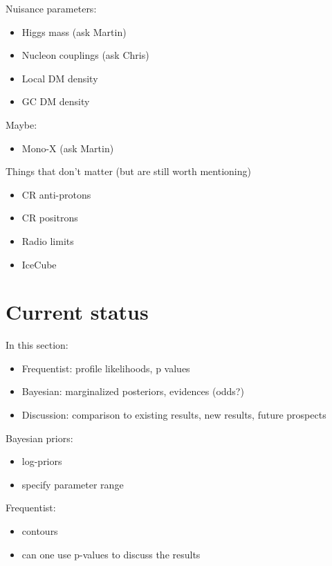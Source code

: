Nuisance parameters:
\begin{itemize}
  \item Higgs mass (ask Martin)
  \item Nucleon couplings (ask Chris)
  \item Local DM density
  \item GC DM density
\end{itemize}

Maybe:
\begin{itemize}
  \item Mono-X (ask Martin)
\end{itemize}

Things that don't matter (but are still worth mentioning)
\begin{itemize}
  \item CR anti-protons
  \item CR positrons
  \item Radio limits
  \item IceCube
\end{itemize}



\section{Current status}
\label{examples}

In this section:
\begin{itemize}
  \item Frequentist: profile likelihoods, p values
  \item Bayesian: marginalized posteriors, evidences (odds?)
  \item Discussion: comparison to existing results, new results, future prospects
\end{itemize}

Bayesian priors:
\begin{itemize}
  \item log-priors
  \item specify parameter range
\end{itemize}

Frequentist:
\begin{itemize}
  \item contours
  \item can one use p-values to discuss the results
\end{itemize}


